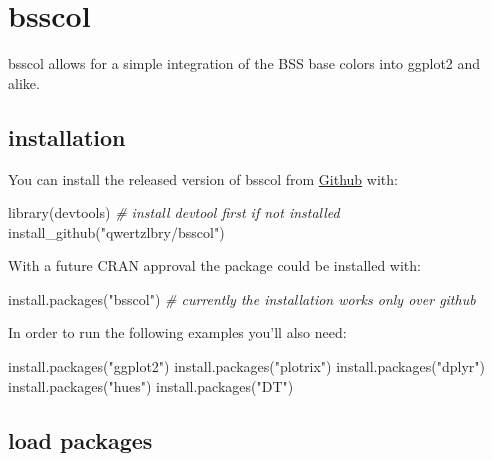 \documentclass[
]{article}
\author{}
\date{\vspace{-2.5em}}
\newenvironment{Shaded}{\begin{snugshade}}{\end{snugshade}}
\newcommand{\CommentTok}[1]{\textcolor[rgb]{0.56,0.35,0.01}{\textit{#1}}}
\newcommand{\FunctionTok}[1]{\textcolor[rgb]{0.00,0.00,0.00}{#1}}
\newcommand{\NormalTok}[1]{#1}
\newcommand{\StringTok}[1]{\textcolor[rgb]{0.31,0.60,0.02}{#1}}
\begin{document}
\hypertarget{bsscol}{%
\section{bsscol}\label{bsscol}}

bsscol allows for a simple integration of the BSS base colors into
ggplot2 and alike.

\hypertarget{installation}{%
\subsection{installation}\label{installation}}

You can install the released version of bsscol from
\href{https://github.com/qwertzlbry/bsscol}{Github} with:

\begin{Shaded}
\begin{Highlighting}[]
\FunctionTok{library}\NormalTok{(devtools) }\CommentTok{\# install devtool first if not installed}
\FunctionTok{install\_github}\NormalTok{(}\StringTok{"qwertzlbry/bsscol"}\NormalTok{)}
\end{Highlighting}
\end{Shaded}

With a future CRAN approval the package could be installed with:

\begin{Shaded}
\begin{Highlighting}[]
\FunctionTok{install.packages}\NormalTok{(}\StringTok{"bsscol"}\NormalTok{) }\CommentTok{\# currently the installation works only over github}
\end{Highlighting}
\end{Shaded}

In order to run the following examples you'll also need:

\begin{Shaded}
\begin{Highlighting}[]
\FunctionTok{install.packages}\NormalTok{(}\StringTok{"ggplot2"}\NormalTok{)}
\FunctionTok{install.packages}\NormalTok{(}\StringTok{"plotrix"}\NormalTok{)}
\FunctionTok{install.packages}\NormalTok{(}\StringTok{"dplyr"}\NormalTok{)}
\FunctionTok{install.packages}\NormalTok{(}\StringTok{"hues"}\NormalTok{)}
\FunctionTok{install.packages}\NormalTok{(}\StringTok{"DT"}\NormalTok{)}
\end{Highlighting}
\end{Shaded}

\hypertarget{load-packages}{%
\subsection{load packages}\label{load-packages}}
\end{document}
